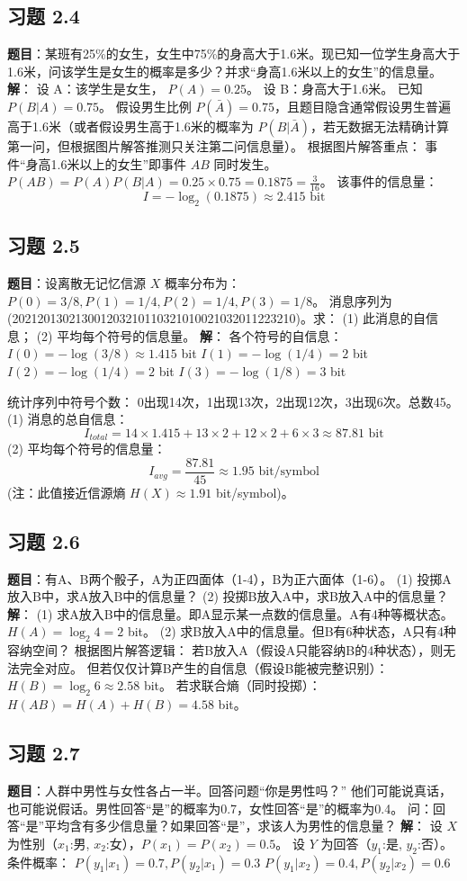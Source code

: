 \documentclass[11pt, a4paper]{article}
\begin{document}
\subsection*{习题 2.4}
\textbf{题目}：某班有25\%的女生，女生中75\%的身高大于1.6米。现已知一位学生身高大于1.6米，问该学生是女生的概率是多少？并求“身高1.6米以上的女生”的信息量。
\textbf{解}：
设 A：该学生是女生， $P(A) = 0.25$。
设 B：身高大于1.6米。
已知 $P(B|A) = 0.75$。
假设男生比例 $P(\bar{A}) = 0.75$，且题目隐含通常假设男生普遍高于1.6米（或者假设男生高于1.6米的概率为 $P(B|\bar{A})$，若无数据无法精确计算第一问，但根据图片解答推测只关注第二问信息量）。
根据图片解答重点：
事件“身高1.6米以上的女生”即事件 $AB$ 同时发生。
$P(AB) = P(A)P(B|A) = 0.25 \times 0.75 = 0.1875 = \frac{3}{16}$。
该事件的信息量：
\[ I = -\log_2(0.1875) \approx 2.415 \text{ bit} \]

\subsection*{习题 2.5}
\textbf{题目}：设离散无记忆信源 $X$ 概率分布为：
$P(0)=3/8, P(1)=1/4, P(2)=1/4, P(3)=1/8$。
消息序列为 (202120130213001203210110321010021032011223210)。求：
(1) 此消息的自信息；
(2) 平均每个符号的信息量。
\textbf{解}：
各个符号的自信息：
$I(0) = -\log(3/8) \approx 1.415$ bit
$I(1) = -\log(1/4) = 2$ bit
$I(2) = -\log(1/4) = 2$ bit
$I(3) = -\log(1/8) = 3$ bit

统计序列中符号个数：
0出现14次，1出现13次，2出现12次，3出现6次。总数45。
(1) 消息的总自信息：
\[ I_{total} = 14 \times 1.415 + 13 \times 2 + 12 \times 2 + 6 \times 3 \approx 87.81 \text{ bit} \]
(2) 平均每个符号的信息量：
\[ I_{avg} = \frac{87.81}{45} \approx 1.95 \text{ bit/symbol} \]
(注：此值接近信源熵 $H(X) \approx 1.91$ bit/symbol)。

\subsection*{习题 2.6}
\textbf{题目}：有A、B两个骰子，A为正四面体（1-4），B为正六面体（1-6）。
(1) 投掷A放入B中，求A放入B中的信息量？
(2) 投掷B放入A中，求B放入A中的信息量？
\textbf{解}：
(1) 求A放入B中的信息量。即A显示某一点数的信息量。A有4种等概状态。
$H(A) = \log_2 4 = 2$ bit。
(2) 求B放入A中的信息量。但B有6种状态，A只有4种容纳空间？
根据图片解答逻辑：
若B放入A（假设A只能容纳B的4种状态），则无法完全对应。
但若仅仅计算B产生的自信息（假设B能被完整识别）：
$H(B) = \log_2 6 \approx 2.58$ bit。
若求联合熵（同时投掷）：$H(AB) = H(A) + H(B) = 4.58$ bit。

\subsection*{习题 2.7}
\textbf{题目}：人群中男性与女性各占一半。回答问题“你是男性吗？”
他们可能说真话，也可能说假话。男性回答“是”的概率为0.7，女性回答“是”的概率为0.4。
问：回答“是”平均含有多少信息量？如果回答“是”，求该人为男性的信息量？
\textbf{解}：
设 $X$ 为性别（$x_1$:男, $x_2$:女），$P(x_1)=P(x_2)=0.5$。
设 $Y$ 为回答（$y_1$:是, $y_2$:否）。
条件概率：
$P(y_1|x_1)=0.7, P(y_2|x_1)=0.3$
$P(y_1|x_2)=0.4, P(y_2|x_2)=0.6$
\end{document}
